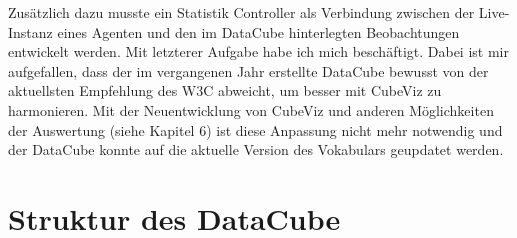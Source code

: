 \documentclass{article}
\begin{document}
 Zusätzlich dazu musste ein Statistik Controller als Verbindung zwischen der Live-Instanz eines Agenten und den im DataCube hinterlegten Beobachtungen entwickelt werden. Mit letzterer Aufgabe habe ich mich beschäftigt. Dabei ist mir aufgefallen, dass der im vergangenen Jahr erstellte DataCube bewusst von der aktuellsten Empfehlung des W3C abweicht, um besser mit CubeViz zu harmonieren. Mit der Neuentwicklung von CubeViz und anderen Möglichkeiten der Auswertung (siehe Kapitel 6) ist diese Anpassung nicht mehr notwendig und der DataCube konnte auf die aktuelle Version des Vokabulars geupdatet werden.

\section{Struktur des DataCube}
\end{document}
